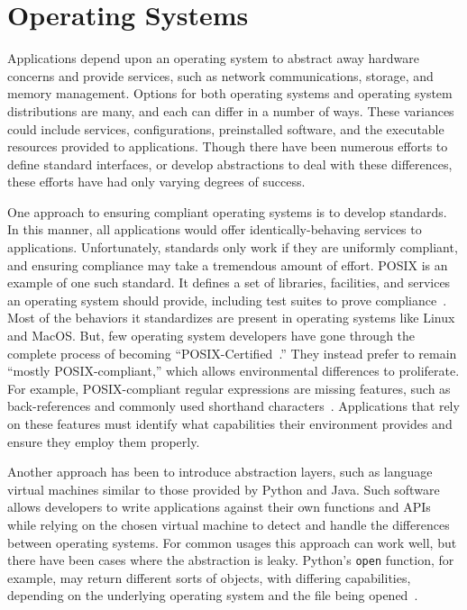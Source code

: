 \section{Operating Systems}
Applications depend upon an operating system to abstract away hardware concerns and provide services, such as network communications,
storage,
and memory management.
Options for both operating systems and operating system distributions are many, and each can differ in a number of ways. These variances could include services,
configurations,
preinstalled software,
and the executable resources provided to applications.
Though there have been numerous efforts to define standard interfaces, or develop abstractions to deal with these differences, these efforts have had only varying degrees of success.

One approach to ensuring compliant operating systems is to develop standards. In this manner, all applications would offer identically-behaving services to applications. 
Unfortunately, standards only work if they are uniformly compliant, and ensuring compliance
may take a tremendous amount of effort.
POSIX is an example of one such standard.
It defines a set of libraries, facilities, and services an operating system should provide, including test suites to prove compliance~\cite{posixoverview}.
Most of the behaviors it standardizes are present in operating systems like Linux and MacOS. But, few operating system developers have gone through the complete process of becoming ``POSIX-Certified~\cite{posixregister}.''
They instead prefer to remain ``mostly POSIX-compliant,'' which allows environmental differences to proliferate. 
For example,
POSIX-compliant regular expressions are missing features, such as back-references and commonly used shorthand characters~\cite{posixregex}.
Applications that rely on these features must identify what capabilities their environment provides and ensure they employ them properly.

Another approach has been to introduce abstraction layers, such as language virtual machines similar to those provided by Python and Java.
Such software allows developers to write applications against their own functions and APIs while relying on the chosen virtual machine to detect and handle the differences between operating systems.
For common usages this approach can work well, but there have been cases where
the abstraction is leaky.
Python's {\tt open} function, for example, may return different sorts of objects,
with differing capabilities,
depending on the underlying operating system and the file being opened~\cite{pythonopen}.

